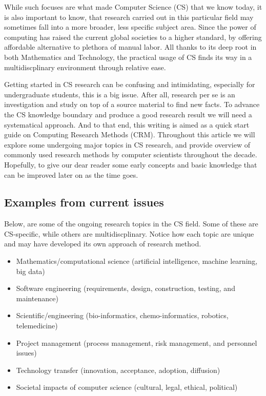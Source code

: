 \documentclass[a4paper,12pt]{article}
\begin{document}
            While such focuses are what made Computer Science (CS) that we know today, it is also important to know, that research carried out in this particular field may sometimes fall into a more broader, less specific subject area. Since the power of computing has raised the current global societies to a higher standard, by offering affordable alternative to plethora of manual labor. All thanks to its deep root in both Mathematics and Technology, the practical usage of CS finds its way in a multidiscplinary environment through relative ease.

            Getting started in CS research can be confusing and intimidating, especially for undergraduate students, this is a big issue. After all, research per se is an investigation and study on top of a source material to find new facts\cite{Utami07}. To advance the CS knowledge boundary and produce a good research result we will need a systematical approach. And to that end, this writing is aimed as a quick start guide on Computing Research Methods (CRM). Throughout this article we will explore some undergoing major topics in CS research, and provide overview of commonly used research methods by computer scientists throughout the decade. Hopefully, to give our dear reader some early concepts and basic knowledge that can be improved later on as the time goes.
        
        \subsection{Examples from current issues}
            Below, are some of the ongoing research topics in the CS field\cite{Ramesh02}. Some of these are CS-specific, while others are multidiscplinary. Notice how each topic are unique and may have developed its own approach of research method.
            \begin{itemize}
                \item Mathematics/computational science (artificial intelligence, machine learning, big data)
                \item Software engineering (requirements, design, construction, testing, and maintenance)
                \item Scientific/engineering (bio-informatics, chemo-informatics, robotics, telemedicine)
                \item Project management (process management, risk management, and personnel issues)
                \item Technology transfer (innovation, acceptance, adoption, diffusion)
                \item Societal impacts of computer science (cultural, legal, ethical, political)
            \end{itemize}
\end{document}
